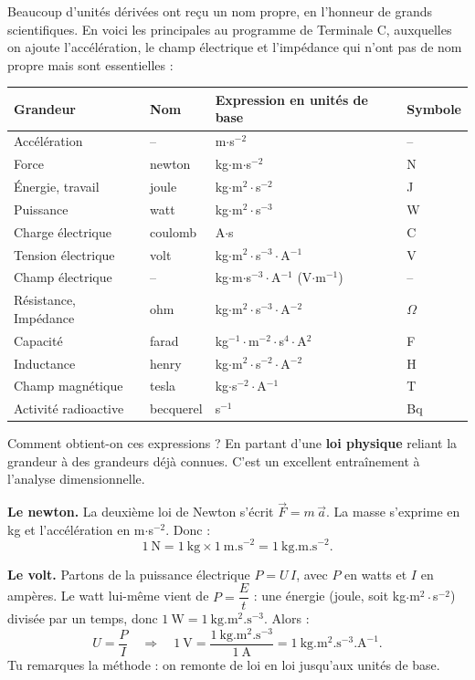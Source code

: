 \documentclass[11pt]{article}
\begin{document}
Beaucoup d'unités dérivées ont reçu un nom propre, en l'honneur de grands scientifiques. En voici les principales au programme de Terminale C, auxquelles on ajoute l'accélération, le champ électrique et l'impédance qui n'ont pas de nom propre mais sont essentielles :

\begin{center}
\begin{tabularx}{\linewidth}{|l|l|X|l|}
\hline
\rowcolor{popblueL} \textbf{Grandeur} & \textbf{Nom} & \textbf{Expression en unités de base} & \textbf{Symbole} \\
\hline
Accélération & -- & m$\cdot$s$^{-2}$ & -- \\
\hline
Force & newton & kg$\cdot$m$\cdot$s$^{-2}$ & N \\
\hline
Énergie, travail & joule & kg$\cdot$m$^{2}\cdot$s$^{-2}$ & J \\
\hline
Puissance & watt & kg$\cdot$m$^{2}\cdot$s$^{-3}$ & W \\
\hline
Charge électrique & coulomb & A$\cdot$s & C \\
\hline
Tension électrique & volt & kg$\cdot$m$^{2}\cdot$s$^{-3}\cdot$A$^{-1}$ & V \\
\hline
Champ électrique & -- & kg$\cdot$m$\cdot$s$^{-3}\cdot$A$^{-1}$ (V$\cdot$m$^{-1}$) & -- \\
\hline
Résistance, Impédance & ohm & kg$\cdot$m$^{2}\cdot$s$^{-3}\cdot$A$^{-2}$ & $\Omega$ \\
\hline
Capacité & farad & kg$^{-1}\cdot$m$^{-2}\cdot$s$^{4}\cdot$A$^{2}$ & F \\
\hline
Inductance & henry & kg$\cdot$m$^{2}\cdot$s$^{-2}\cdot$A$^{-2}$ & H \\
\hline
Champ magnétique & tesla & kg$\cdot$s$^{-2}\cdot$A$^{-1}$ & T \\
\hline
Activité radioactive & becquerel & s$^{-1}$ & Bq \\
\hline
\end{tabularx}
\end{center}

Comment obtient-on ces expressions ? En partant d'une \textbf{loi physique} reliant la grandeur à des grandeurs déjà connues. C'est un excellent entraînement à l'analyse dimensionnelle.

\begin{exemplebox}
\textbf{Le newton.} La deuxième loi de Newton s'écrit $\vec{F} = m\,\vec{a}$. La masse s'exprime en kg et l'accélération en m$\cdot$s$^{-2}$. Donc :
\[ 1~\mathrm{N} = 1~\mathrm{kg} \times 1~\mathrm{m.s^{-2}} = 1~\mathrm{kg.m.s^{-2}}. \]

\textbf{Le volt.} Partons de la puissance électrique $P = U\,I$, avec $P$ en watts et $I$ en ampères. Le watt lui-même vient de $P = \dfrac{E}{t}$ : une énergie (joule, soit kg$\cdot$m$^{2}\cdot$s$^{-2}$) divisée par un temps, donc $1~\mathrm{W} = 1~\mathrm{kg.m^{2}.s^{-3}}$. Alors :
\[ U = \frac{P}{I} \quad\Longrightarrow\quad 1~\mathrm{V} = \frac{1~\mathrm{kg.m^{2}.s^{-3}}}{1~\mathrm{A}} = 1~\mathrm{kg.m^{2}.s^{-3}.A^{-1}}. \]
Tu remarques la méthode : on remonte de loi en loi jusqu'aux unités de base.
\end{exemplebox}
\end{document}
